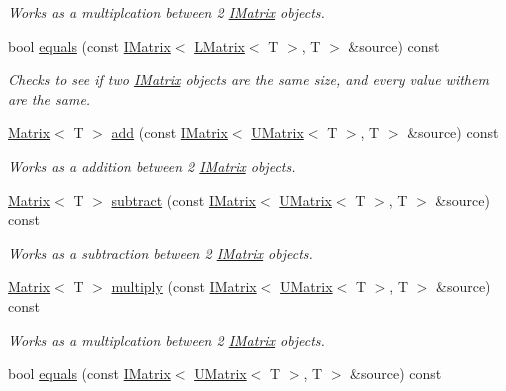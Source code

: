 \begin{DoxyCompactItemize}
\begin{DoxyCompactList}\small\item\em Works as a multiplcation between 2 \mbox{\hyperlink{class_i_matrix}{I\+Matrix}} objects. \end{DoxyCompactList}\item 
bool \mbox{\hyperlink{class_d_matrix_aab5e553e6c6222238be1b52ee044848f}{equals}} (const \mbox{\hyperlink{class_i_matrix}{I\+Matrix}}$<$ \mbox{\hyperlink{class_l_matrix}{L\+Matrix}}$<$ T $>$, T $>$ \&source) const
\begin{DoxyCompactList}\small\item\em Checks to see if two \mbox{\hyperlink{class_i_matrix}{I\+Matrix}} objects are the same size, and every value withem are the same. \end{DoxyCompactList}\item 
\mbox{\hyperlink{class_matrix}{Matrix}}$<$ T $>$ \mbox{\hyperlink{class_d_matrix_a601ee8112f88b1fb6397fef3bb2e9140}{add}} (const \mbox{\hyperlink{class_i_matrix}{I\+Matrix}}$<$ \mbox{\hyperlink{class_u_matrix}{U\+Matrix}}$<$ T $>$, T $>$ \&source) const
\begin{DoxyCompactList}\small\item\em Works as a addition between 2 \mbox{\hyperlink{class_i_matrix}{I\+Matrix}} objects. \end{DoxyCompactList}\item 
\mbox{\hyperlink{class_matrix}{Matrix}}$<$ T $>$ \mbox{\hyperlink{class_d_matrix_a1f25b5ba98d6b13bc1bf660df672bf33}{subtract}} (const \mbox{\hyperlink{class_i_matrix}{I\+Matrix}}$<$ \mbox{\hyperlink{class_u_matrix}{U\+Matrix}}$<$ T $>$, T $>$ \&source) const
\begin{DoxyCompactList}\small\item\em Works as a subtraction between 2 \mbox{\hyperlink{class_i_matrix}{I\+Matrix}} objects. \end{DoxyCompactList}\item 
\mbox{\hyperlink{class_matrix}{Matrix}}$<$ T $>$ \mbox{\hyperlink{class_d_matrix_aca6d817192a416c42f76790ac49cfa0a}{multiply}} (const \mbox{\hyperlink{class_i_matrix}{I\+Matrix}}$<$ \mbox{\hyperlink{class_u_matrix}{U\+Matrix}}$<$ T $>$, T $>$ \&source) const
\begin{DoxyCompactList}\small\item\em Works as a multiplcation between 2 \mbox{\hyperlink{class_i_matrix}{I\+Matrix}} objects. \end{DoxyCompactList}\item 
bool \mbox{\hyperlink{class_d_matrix_a6ca57f0b529b46fd7b2a12d43f425348}{equals}} (const \mbox{\hyperlink{class_i_matrix}{I\+Matrix}}$<$ \mbox{\hyperlink{class_u_matrix}{U\+Matrix}}$<$ T $>$, T $>$ \&source) const

\end{DoxyCompactItemize}
